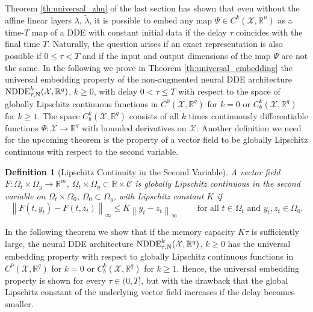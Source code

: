 \documentclass[10pt]{article}
\numberwithin{equation}{section}
\newtheorem{definition}[theorem]{Definition}
\newcommand\norm[1]{\left\lVert#1\right\rVert}
\begin{document}
	Theorem \ref{th:universal_zhu} of the last section has shown that even without the affine linear layers $\lambda$, $\tilde{\lambda}$, it is possible to embed any map  $\Psi\in C^k(\mathcal{X}, \mathbb{R}^n)$ as a time-$T$ map of a DDE with constant initial data if the delay $\tau$ coincides with the final time $T$. Naturally, the question arises if an exact representation is also possible if $0 \leq \tau < T$ and if the input and output dimensions of the map $\Psi$ are not the same. In the following we prove in Theorem \ref{th:universal_embedding} the universal embedding property of the non-augmented neural DDE architecture $\textup{NDDE}^k_{\tau,\text{N}}(\mathcal{X},\mathbb{R}^q)$, $k \geq 0$, with delay $0 < \tau \leq T$ with respect to the space of globally Lipschitz continuous functions in $C^0(\mathcal{X},\mathbb{R}^q)$ for $k = 0$ or $C^k_b(\mathcal{X},\mathbb{R}^q)$ for $k \geq 1$. The space $C^{k}_b(\mathcal{X},\mathbb{R}^q)$ consists of all $k$ times continuously differentiable functions $\Psi:\mathcal{X}\rightarrow\mathbb{R}^q$ with bounded derivatives on $\mathcal{X}$. Another definition we need for the upcoming theorem is the property of a vector field to be globally Lipschitz continuous with respect to the second variable. 
	
	\begin{definition}[Lipschitz Continuity in the Second Variable]
		A vector field $F: \Omega_t \times \Omega_y \rightarrow \mathbb{R}^m$, $\Omega_t \times \Omega_y \subset \mathbb{R}\times \mathcal{C}$ is globally Lipschitz continuous in the second variable on $\Omega_t \times \Omega_0$, $\Omega_0 \subset \Omega_y$, with Lipschitz constant $K$ if 
		\begin{equation*}
			\norm{F(t,y_t)-F(t,z_t)}_\infty \leq K \norm{y_t-z_t}_\infty \qquad \text{ for all } t \in \Omega_t \text{ and } y_t,z_t \in \Omega_0.
		\end{equation*}
	\end{definition}
	
	In the following theorem we show that if the memory capacity $K\tau$ is sufficiently large, the neural DDE architecture $\textup{NDDE}^k_{\tau,\textup{N}}(\mathcal{X},\mathbb{R}^q)$, $k \geq 0$ has the universal embedding property with respect to globally Lipschitz continuous functions in $C^0(\mathcal{X},\mathbb{R}^q)$ for $k = 0$ or $C^k_b(\mathcal{X},\mathbb{R}^q)$ for $k \geq 1$. Hence, the universal embedding property is shown for every $\tau\in(0,T]$, but with the drawback that the global Lipschitz constant of the underlying vector field increases if the delay becomes smaller.
	
\end{document}
